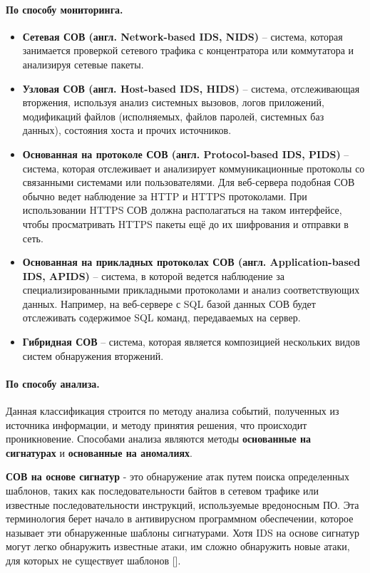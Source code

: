 \paragraph*{По способу мониторинга.}

\begin{itemize}
	\item \textbf{Сетевая СОВ (англ. Network-based IDS, NIDS)} -- система,
	которая занимается проверкой сетевого трафика с концентратора или коммутатора и
	анализируя сетевые пакеты.

	\item \textbf{Узловая СОВ (англ. Host-based IDS, HIDS)} -- система,
	отслеживающая вторжения, используя анализ системных вызовов, логов приложений,
	модификаций файлов (исполняемых, файлов паролей, системных баз данных), состояния
	хоста и прочих источников.
	
	\item \textbf{Основанная на протоколе СОВ (англ. Protocol-based IDS, PIDS)} -- система, которая отслеживает и анализирует коммуникационные протоколы со связанными системами или пользователями. Для веб-сервера подобная СОВ обычно ведет наблюдение за HTTP и HTTPS протоколами. При использовании HTTPS СОВ должна располагаться на таком интерфейсе, чтобы просматривать HTTPS пакеты ещё до их шифрования и отправки в сеть.

	\item \textbf{Основанная на прикладных протоколах СОВ (англ. Application-based IDS, APIDS)} --
	система, в которой ведется наблюдение за специализированными прикладными протоколами
	и анализ соответствующих данных. Например, на веб-сервере с SQL базой данных СОВ будет
	отслеживать содержимое SQL команд, передаваемых на сервер.

	\item \textbf{Гибридная СОВ} -- система, которая является композицией нескольких видов
	систем обнаружения вторжений.
\end{itemize}


\paragraph*{По способу анализа.}

Данная классификация строится по методу анализа событий,
полученных из источника информации, и методу принятия решения, что происходит
проникновение. Способами анализа являются методы \textbf{основанные на сигнатурах} и
\textbf{основанные на аномалиях}.

\textbf{СОВ на основе сигнатур} - это обнаружение атак путем поиска определенных шаблонов, таких как последовательности байтов в сетевом трафике или известные последовательности инструкций, используемые вредоносным ПО. Эта терминология берет начало в антивирусном программном обеспечении, которое называет эти обнаруженные шаблоны сигнатурами. Хотя IDS на основе сигнатур могут легко обнаружить известные атаки, им сложно обнаружить новые атаки, для которых не существует шаблонов [\cite{NetSecChristos}].

